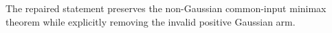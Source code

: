 The repaired statement preserves the non-Gaussian common-input minimax theorem while explicitly removing the invalid positive Gaussian arm.